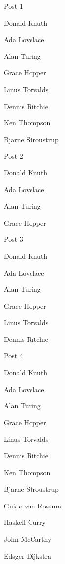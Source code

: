 \documentclass{dsekelectionproposal}
\begin{document}
\setdate{\today}

\maketitle

\begin{vemsection}
    \begin{vemlist}{Post 1}
        \item Donald Knuth
        \item Ada Lovelace
        \item Alan Turing
        \item Grace Hopper
        \item Linus Torvalds
        \item Dennis Ritchie
        \item Ken Thompson
        \item Bjarne Stroustrup
    \end{vemlist}

    \begin{vemlist}{Post 2}
        \item Donald Knuth
        \item Ada Lovelace
        \item Alan Turing
        \item Grace Hopper
    \end{vemlist}

    \begin{vemlist}{Post 3}
        \item Donald Knuth
        \item Ada Lovelace
        \item Alan Turing
        \item Grace Hopper
        \item Linus Torvalds
        \item Dennis Ritchie
    \end{vemlist}

    \begin{vemlist}{Post 4}
        \item Donald Knuth
        \item Ada Lovelace
        \item Alan Turing
        \item Grace Hopper
        \item Linus Torvalds
        \item Dennis Ritchie
        \item Ken Thompson
        \item Bjarne Stroustrup
        \item Guido van Rossum
        \item Haskell Curry
        \item John McCarthy
        \item Edsger Dijkstra
    \end{vemlist}


\end{vemsection}
\end{document}
